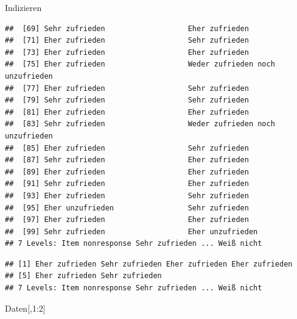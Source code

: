 \documentclass[ignorenonframetext,]{beamer}
\newenvironment{Shaded}{}{}
\newcommand{\DecValTok}[1]{\textcolor[rgb]{0.25,0.63,0.44}{{#1}}}
\newcommand{\NormalTok}[1]{{#1}}
\begin{document}
\begin{frame}[fragile]{Indizieren}
\begin{verbatim}
##  [69] Sehr zufrieden                   Eher zufrieden                  
##  [71] Eher zufrieden                   Sehr zufrieden                  
##  [73] Eher zufrieden                   Eher zufrieden                  
##  [75] Eher zufrieden                   Weder zufrieden noch unzufrieden
##  [77] Eher zufrieden                   Sehr zufrieden                  
##  [79] Sehr zufrieden                   Sehr zufrieden                  
##  [81] Eher zufrieden                   Eher zufrieden                  
##  [83] Sehr zufrieden                   Weder zufrieden noch unzufrieden
##  [85] Eher zufrieden                   Sehr zufrieden                  
##  [87] Sehr zufrieden                   Eher zufrieden                  
##  [89] Eher zufrieden                   Eher zufrieden                  
##  [91] Sehr zufrieden                   Eher zufrieden                  
##  [93] Eher zufrieden                   Sehr zufrieden                  
##  [95] Eher unzufrieden                 Sehr zufrieden                  
##  [97] Eher zufrieden                   Eher zufrieden                  
##  [99] Sehr zufrieden                   Eher unzufrieden                
## 7 Levels: Item nonresponse Sehr zufrieden ... Weiß nicht
\end{verbatim}

\begin{verbatim}
## [1] Eher zufrieden Sehr zufrieden Eher zufrieden Eher zufrieden
## [5] Eher zufrieden Sehr zufrieden
## 7 Levels: Item nonresponse Sehr zufrieden ... Weiß nicht
\end{verbatim}

\begin{Shaded}
\begin{Highlighting}[]
\NormalTok{Daten[,}\DecValTok{1}\NormalTok{:}\DecValTok{2}\NormalTok{]}
\end{Highlighting}
\end{Shaded}


\end{frame}
\end{document}
